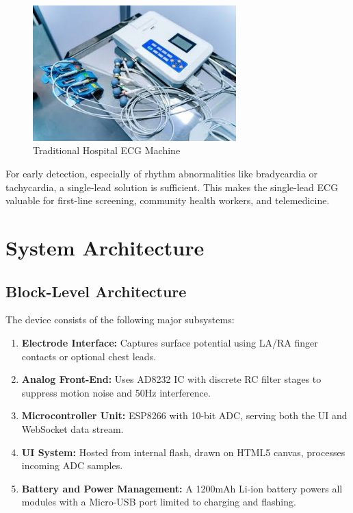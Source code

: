 \begin{figure}[H]
    \centering
    \includegraphics[width=0.7\textwidth]{images/hospital_ecg.jpg}
    \caption{Traditional Hospital ECG Machine}
    \label{fig:hospital_ecg}
\end{figure}

For early detection, especially of rhythm abnormalities like bradycardia or tachycardia, a single-lead solution is sufficient. This makes the single-lead ECG valuable for first-line screening, community health workers, and telemedicine.







\chapter{System Architecture}

\section{Block-Level Architecture}
The device consists of the following major subsystems:
\begin{enumerate}
    \item \textbf{Electrode Interface:} Captures surface potential using LA/RA finger contacts or optional chest leads.
    \item \textbf{Analog Front-End:} Uses AD8232 IC with discrete RC filter stages to suppress motion noise and 50Hz interference.
    \item \textbf{Microcontroller Unit:} ESP8266 with 10-bit ADC, serving both the UI and WebSocket data stream.
    \item \textbf{UI System:} Hosted from internal flash, drawn on HTML5 canvas, processes incoming ADC samples.
    \item \textbf{Battery and Power Management:} A 1200mAh Li-ion battery powers all modules with a Micro-USB port limited to charging and flashing.
\end{enumerate}

